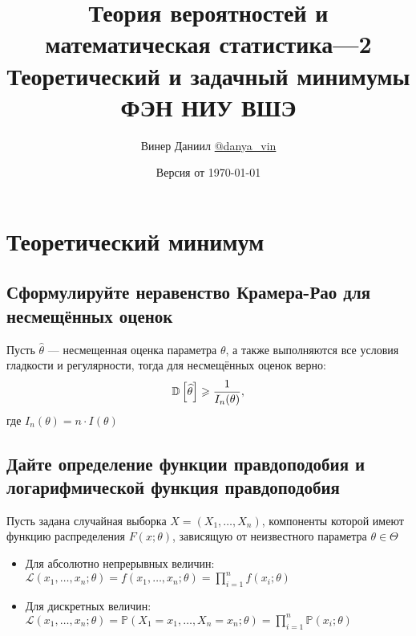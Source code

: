 \documentclass{article}
\title{\LARGE{Теория вероятностей и математическая статистика—2}\\
Теоретический и задачный минимумы\\
ФЭН НИУ ВШЭ}
\author{Винер Даниил  \href{https://t.me/danya_vin}{@danya\_vin}}
\date{Версия от \today}
\begin{document}
\maketitle
\tableofcontents
\newpage
\setlength{\parindent}{15pt}
\setlength{\parskip}{2mm}
\section{Теоретический минимум}

\subsection{Сформулируйте неравенство Крамера-Рао для несмещённых оценок}
Пусть $\widehat{\theta}$ — несмещенная оценка параметра $\theta$, а также выполняются все условия гладкости и регулярности, тогда для несмещённых оценок верно:
\begin{equation*}
    \mathbb{D}\left[\widehat{\theta}\right]\geqslant \frac{1}{I_n(\theta)},
\end{equation*}
где $I_n(\theta)=n\cdot I(\theta)$

\subsection{Дайте определение функции правдоподобия и логарифмической функция правдоподобия}
 Пусть задана случайная выборка $X=\left(X_{1}, \ldots, X_{n}\right)$, компоненты которой имеют функцию распределения $F(x; \theta)$, зависящую от неизвестного параметра $\theta \in \Theta$
\begin{itemize}
    \item Для абсолютно непрерывных величин: $\mathcal{L}\left(x_{1}, \ldots, x_{n} ; \theta\right)=f\left(x_{1}, \ldots, x_{n} ; \theta\right)=\displaystyle\prod_{i=1}^n f(x_i;\theta)$
    \item Для дискретных величин: $\mathcal{L}\left(x_{1}, \ldots, x_{n} ; \theta\right)=\mathbb{P}\left(X_1=x_1,\ldots,X_n=x_n;\theta\right)=\displaystyle\prod_{i=1}^n\mathbb{P}\left(x_i;\theta\right)$
\end{itemize}
\end{document}
